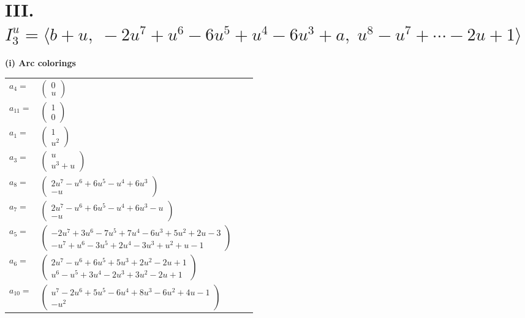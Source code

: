 \documentclass[1p]{elsarticle_modified}
\theoremstyle{definition}
\begin{document}
\centering \section*{III. $I^u_{3}= \langle b+u,\;-2 u^7+u^6-6 u^5+u^4-6 u^3+a,\;u^8- u^7+\cdots-2 u+1 \rangle$}
\flushleft \textbf{(i) Arc colorings}\\
\begin{tabular}{m{7pt} m{180pt} m{7pt} m{180pt} }
\flushright $a_{4}=$&$\begin{pmatrix}0\\u\end{pmatrix}$ \\
\flushright $a_{11}=$&$\begin{pmatrix}1\\0\end{pmatrix}$ \\
\flushright $a_{1}=$&$\begin{pmatrix}1\\u^2\end{pmatrix}$ \\
\flushright $a_{3}=$&$\begin{pmatrix}u\\u^3+u\end{pmatrix}$ \\
\flushright $a_{8}=$&$\begin{pmatrix}2 u^7- u^6+6 u^5- u^4+6 u^3\\- u\end{pmatrix}$ \\
\flushright $a_{7}=$&$\begin{pmatrix}2 u^7- u^6+6 u^5- u^4+6 u^3- u\\- u\end{pmatrix}$ \\
\flushright $a_{5}=$&$\begin{pmatrix}-2 u^7+3 u^6-7 u^5+7 u^4-6 u^3+5 u^2+2 u-3\\- u^7+u^6-3 u^5+2 u^4-3 u^3+u^2+u-1\end{pmatrix}$ \\
\flushright $a_{6}=$&$\begin{pmatrix}2 u^7- u^6+6 u^5+5 u^3+2 u^2-2 u+1\\u^6- u^5+3 u^4-2 u^3+3 u^2-2 u+1\end{pmatrix}$ \\
\flushright $a_{10}=$&$\begin{pmatrix}u^7-2 u^6+5 u^5-6 u^4+8 u^3-6 u^2+4 u-1\\- u^2\end{pmatrix}$ \\

\end{tabular}
\end{document}
